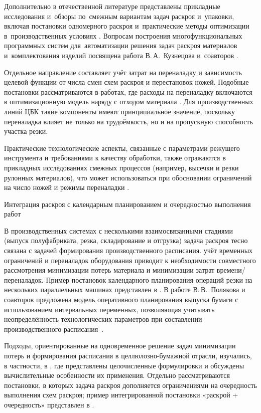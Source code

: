 Дополнительно в отечественной литературе представлены прикладные исследования и~обзоры по~смежным вариантам задач раскроя и~упаковки, включая постановки одномерного раскроя и~практические методы оптимизации в~производственных условиях \cite{васин2012решение,агапов2021оптимизация,емельянов1996раскрой,тимофеева2013генетический}.
Вопросам построения многофункциональных программных систем для~автоматизации решения задач раскроя материалов и~комплектования изделий посвящена работа В.\,А.~Кузнецова и~соавторов \cite{кузнецов2008многофункциональная}.

Отдельное направление составляет учёт затрат на переналадку и зависимость целевой функции от числа смен схем раскроя и перестановок ножей.
Подобные постановки рассматриваются в работах, где расходы на переналадку включаются в оптимизационную модель наряду с отходом материала \cite{mobasher2013,martina2022}.
Для производственных линий ЦБК такие компоненты имеют принципиальное значение, поскольку переналадка влияет не только на трудоёмкость, но и на пропускную способность участка резки.

Практические технологические аспекты, связанные с параметрами режущего инструмента и требованиями к качеству обработки, также отражаются в прикладных исследованиях смежных процессов (например, высечки и резки рулонных материалов), что может использоваться при обосновании ограничений на число ножей и режимы переналадки \cite{bobrov2016}.

{Интеграция раскроя с календарным планированием и очередностью выполнения работ}\label{subsec:theor_ch/integration_scheduling}

В производственных системах с несколькими взаимосвязанными стадиями (выпуск полуфабриката, резка, складирование и отгрузка) задача раскроя тесно связана с задачей формирования производственного расписания.
учёт временных ограничений и переналадок оборудования приводит к необходимости совместного рассмотрения минимизации потерь материала и минимизации затрат времени/переналадок.
Пример постановок календарного планирования операций резки на нескольких параллельных машинах представлен в \cite{giannelos2001parallel, pierce1964_paper_scheduling}.
В работе В.\,В.~Полякова и соавторов предложена модель оперативного планирования выпуска бумаги с использованием интервальных переменных, позволяющая учитывать неопределённость технологических параметров при составлении производственного расписания~\cite{поляков2005оперативное}.

Подходы, ориентированные на одновременное решение задач минимизации потерь и формирования расписания в целлюлозно-бумажной отрасли, изучались, в частности, в \cite{harjunkoski1996trimloss, westerlund1998trimloss_scheduling}, где представлены целочисленные формулировки и обсуждены вычислительные особенности их применения.
Отдельно рассматриваются постановки, в которых задача раскроя дополняется ограничениями на очередность выполнения схем раскроя; пример интегрированной постановки «раскрой + очередность» представлен в \cite{yanasse2007integrated}.

